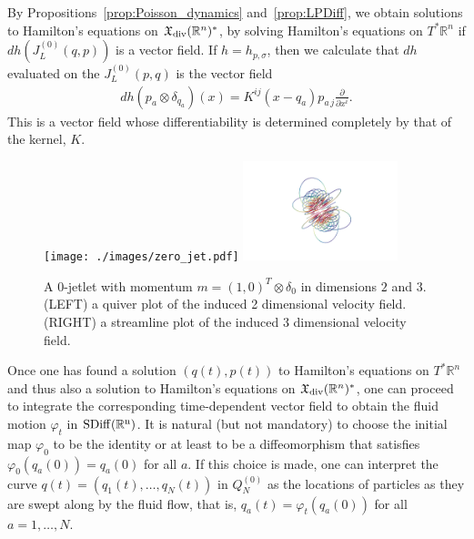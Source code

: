 \documentclass[12pt]{amsart}
\newcommand{\pder}[2]{\ensuremath{\frac{\partial #1}{\partial #2}}}
\newcommand{\R}{\ensuremath{\mathbb{R}}}
\begin{document}
By Propositions~\ref{prop:Poisson_dynamics} and~\ref{prop:LPDiff},
we obtain solutions to Hamilton's equations
on $\mathfrak{X}_{\rm div}(\R^n)^*$, by solving
Hamilton's equations on $T^*\R^n$ if $dh( J_L^{(0)}(q,p) )$ is
a vector field.  If $h = h_{p,\sigma}$, then we calculate that $dh$
evaluated on the $J_L^{(0)}(p,q)$ is the vector field
\begin{align*}
	dh( p_a \otimes \delta_{q_a} )  (x) = K^{ij}(x - q_a) p_{a\,j} \pder{}{x^i}.
\end{align*}
This is a vector field whose differentiability is determined completely by that of
the kernel, $K$.
\begin{figure}
	\centering
	\texttt{[image: ./images/zero\_jet.pdf]}
	\includegraphics[width = 0.4\textwidth]{./images/zero_jet_3D.png}
	\caption{A $0$-jetlet with momentum $m = (1,0)^T \otimes \delta_0$ in dimensions $2$ and $3$.
	(LEFT) a quiver plot of the induced 2 dimensional velocity field.
	(RIGHT) a streamline plot of the induced 3 dimensional velocity field. }
	\label{fig:zero_jetlet}
\end{figure}
Once one has found a solution $(q(t), p(t))$ to Hamilton's equations on $T^*\mathbb{R}^n$ and thus also a solution to Hamilton's equations on $\mathfrak{X}_{\rm div}(\mathbb{R}^n)^*$, one can proceed to integrate the corresponding time-dependent vector field to obtain the fluid motion $\varphi_t$ in $\rm{SDiff}(\mathbb{R}^n)$. It is natural (but not mandatory) to choose the initial map $\varphi_0$ to be the identity or at least to be a diffeomorphism that satisfies $\varphi_0(q_a(0))= q_a(0)$ for all $a$.
  If this choice is made, one can interpret the curve $q(t) = (q_1(t), \ldots, q_N(t))$ in $Q_N^{(0)}$ as the locations of particles as they are swept along by the fluid flow, that is, $q_a(t) = \varphi_t(q_a(0))$ for all $a = 1, \ldots, N$. 
  
\end{document}
